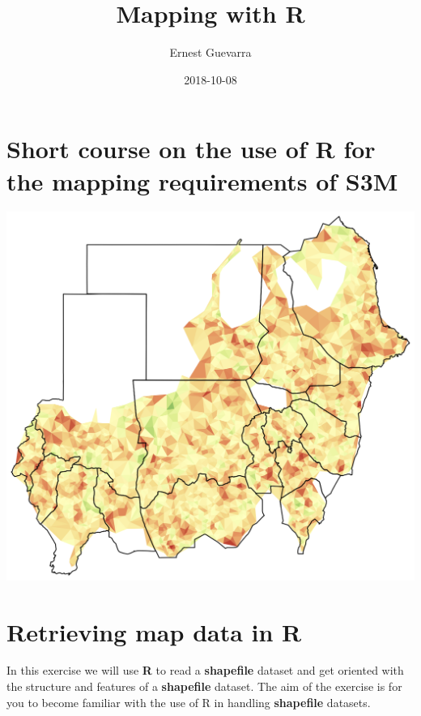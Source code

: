 \documentclass[12pt,a4paper,a4paper]{book}
\title{Mapping with R}
\author{Ernest Guevarra}
\date{2018-10-08}
\theoremstyle{definition}
\theoremstyle{definition}
\theoremstyle{definition}
\theoremstyle{remark}
\begin{document}
\maketitle

{
\hypersetup{linkcolor=black}
\setcounter{tocdepth}{1}
\tableofcontents
}
\listoftables
\listoffigures
\hypertarget{short-course-on-the-use-of-r-for-the-mapping-requirements-of-s3m}{%
\chapter*{Short course on the use of R for the mapping requirements of
S3M}\label{short-course-on-the-use-of-r-for-the-mapping-requirements-of-s3m}}

\includegraphics{figures/sudanMapTriSim.png}

\hypertarget{exercise1}{%
\chapter{Retrieving map data in R}\label{exercise1}}

In this exercise we will use \textbf{R} to read a \textbf{shapefile}
dataset and get oriented with the structure and features of a
\textbf{shapefile} dataset. The aim of the exercise is for you to become
familiar with the use of R in handling \textbf{shapefile} datasets.
\end{document}
